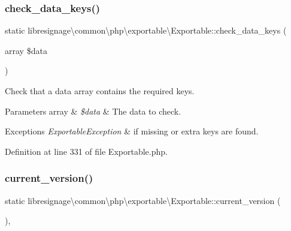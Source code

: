 \subsubsection{\texorpdfstring{check\+\_\+data\+\_\+keys()}{check\_data\_keys()}}
{\footnotesize\ttfamily static libresignage\textbackslash{}common\textbackslash{}php\textbackslash{}exportable\textbackslash{}\+Exportable\+::check\+\_\+data\+\_\+keys (\begin{DoxyParamCaption}\item[{array}]{\$data }\end{DoxyParamCaption})\hspace{0.3cm}{\ttfamily [static]}}

Check that a data array contains the required keys.


\begin{DoxyParams}[1]{Parameters}
array & {\em \$data} & The data to check.\\
\hline
\end{DoxyParams}

\begin{DoxyExceptions}{Exceptions}
{\em Exportable\+Exception} & if missing or extra keys are found. \\
\hline
\end{DoxyExceptions}


Definition at line 331 of file Exportable.\+php.

\mbox{\label{classlibresignage_1_1common_1_1php_1_1exportable_1_1Exportable_a96de6ce92106f05004ac53fb06b6a7b7}} 
\subsubsection{\texorpdfstring{current\+\_\+version()}{current\_version()}}
{\footnotesize\ttfamily static libresignage\textbackslash{}common\textbackslash{}php\textbackslash{}exportable\textbackslash{}\+Exportable\+::current\+\_\+version (\begin{DoxyParamCaption}{ }\end{DoxyParamCaption})\hspace{0.3cm}{\ttfamily [static]}, {\ttfamily [private]}}


